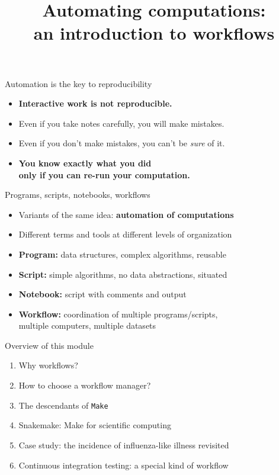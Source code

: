 \documentclass[aspectratio=169]{beamer}
\title{Automating computations:\\ an introduction to workflows}
\date{}
\begin{document}
\begin{frame}
\titlepage
\end{frame}

\begin{frame}{Automation is the key to reproducibility}

  \begin{itemize}
  \item \textbf{Interactive work is not reproducible.}
  \item Even if you take notes carefully, you will make mistakes.
  \item Even if you don't make mistakes, you can't be \textit{sure} of it.
  \item \textbf{You know exactly what you did \\ only if you can re-run your computation.}
  \end{itemize}

\end{frame}

\begin{frame}{Programs, scripts, notebooks, workflows}

  \begin{itemize}
  \item Variants of the same idea: \textbf{automation of computations}
  \item Different terms and tools at different levels of organization
  \item \textbf{Program:} data structures, complex algorithms, reusable
  \item \textbf{Script:} simple algorithms, no data abstractions, situated
  \item \textbf{Notebook:} script with comments and output
  \item \textbf{Workflow:} coordination of multiple programs/scripts, \\
                           multiple computers, multiple datasets
  \end{itemize}

\end{frame}

\begin{frame}{Overview of this module}

  \begin{enumerate}
  \item Why workflows?
  \item How to choose a workflow manager?
  \item The descendants of \texttt{Make}
  \item Snakemake: Make for scientific computing
  \item Case study: the incidence of influenza-like illness revisited
  \item Continuous integration testing: a special kind of workflow
  \end{enumerate}

\end{frame}
\end{document}
